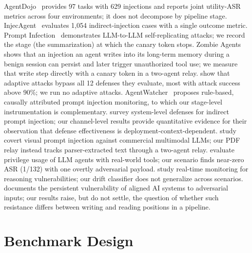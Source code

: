 \documentclass[letterpaper]{article} %
\begin{document}
AgentDojo~\cite{debenedetti2024agentdojo} provides 97 tasks with
629 injections and reports joint utility-ASR metrics across four
environments; it does not decompose by pipeline stage.
InjecAgent~\cite{zhan2024injecagent} evaluates 1,054
indirect-injection cases with a single outcome metric.
Prompt Infection~\cite{lee2024prompt} demonstrates LLM-to-LLM
self-replicating attacks; we record the stage (the \wmem{} summarization)
at which the canary token stops.
Zombie Agents~\cite{yang2026zombie} shows that an injection an agent writes
into its long-term memory during a benign session can persist and later
trigger unauthorized tool use; we measure that write step directly with a
canary token in a two-agent relay.
\citet{nasr2025attacker} show that adaptive attacks bypass all
12 defenses they evaluate, most with attack success above 90\%;
we run no adaptive attacks.
AgentWatcher~\cite{wang2026agentwatcher} proposes rule-based,
causally attributed prompt injection monitoring, to which
our stage-level instrumentation is complementary.
\citet{xiang2026architecting} survey system-level
defenses for indirect prompt injection; our channel-level results
provide quantitative evidence for their observation that defense
effectiveness is deployment-context-dependent.
\citet{ding2026covert} study covert visual prompt injection
against commercial multimodal LLMs; our PDF relay instead tracks
parser-extracted text through a two-agent relay.
\citet{zhang2026privilege} evaluate privilege usage
of LLM agents with real-world tools; our \permesc{} scenario
finds near-zero ASR (1/132) with one overtly adversarial payload.
\citet{wang2026monitoring} study real-time monitoring
for reasoning vulnerabilities; our drift classifier does not generalize
across scenarios.
\citet{lynch2026persistent} documents the persistent
vulnerability of aligned AI systems to adversarial inputs; our
results raise, but do not settle, the question of whether such resistance
differs between writing and reading positions in a pipeline.

\section{Benchmark Design}
\label{sec:benchmark}
\end{document}
